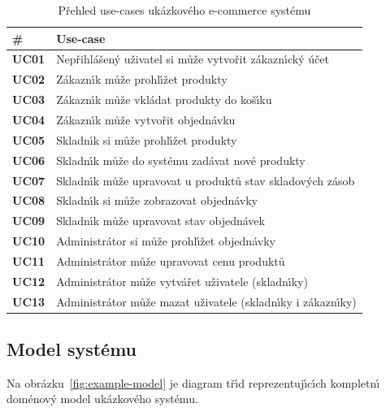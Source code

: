 \begin{table}[h]
    \centering
    \begin{tabular*}{\textwidth}{ l l }
        \hline
        \textbf{\#} & \textbf{Use-case} \\
        \hline \hline
        \textbf{UC01} & Nepřihlášen\'y uživatel si může vytvořit zákazn\'{\i}ck\'y účet \\
        \textbf{UC02} & Zákazn\'{\i}k může prohl\'{\i}žet produkty \\
        \textbf{UC03} & Zákazn\'{\i}k může vkládat produkty do koš\'{\i}ku \\
        \textbf{UC04} & Zákazn\'{\i}k může vytvořit objednávku \\
        \textbf{UC05} & Skladn\'{\i}k si může prohl\'{\i}žet produkty \\
        \textbf{UC06} & Skladn\'{\i}k může do systému zadávat nové produkty \\
        \textbf{UC07} & Skladn\'{\i}k může upravovat u produktů stav skladov\'ych zásob \\
        \textbf{UC08} & Skladn\'{\i}k si může zobrazovat objednávky \\
        \textbf{UC09} & Skladn\'{\i}k může upravovat stav objednávek \\
        \textbf{UC10} & Administrátor si může prohl\'{\i}žet objednávky \\
        \textbf{UC11} & Administrátor může upravovat cenu produktů \\
        \textbf{UC12} & Administrátor může vytvářet uživatele (skladn\'{\i}ky) \\
        \textbf{UC13} & Administrátor může mazat uživatele (skladn\'{\i}ky i zákazn\'{\i}ky) \\
        \hline
    \end{tabular*}
    \caption{Přehled use-cases ukázkového e-commerce systému}
    \label{tbl:use-cases}
\end{table}

\subsection{Model systému}

Na obrázku~\ref{fig:example-model} je diagram tř\'{\i}d reprezentuj\'{\i}c\'{\i}ch
kompletn\'{\i} doménov\'y model ukázkového systému.

